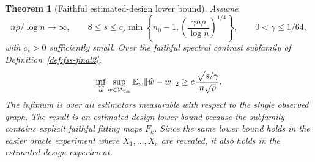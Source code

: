 \documentclass[12pt]{article}
\newtheorem{theorem}{Theorem}
\newcommand{\1}{\mathbf{1}}
\providecommand{\Eb}{\mathbb E}
\providecommand{\calW}{\mathcal W}
\begin{document}
\begin{theorem}[Faithful estimated-design lower bound]\label{thm:fss-lb-final2}
Assume
\[
  n\rho/\log n\to\infty,\qquad
  8\le s\le
  c_s\min\left\{n_0-1,\left(\frac{\gamma n\rho}{\log n}\right)^{1/4}\right\},
  \qquad
  0<\gamma\le 1/64,
\]
with \(c_s>0\) sufficiently small.  Over the faithful spectral contrast
subfamily of Definition~\ref{def:fss-final2},
\[
  \inf_{\widehat w}
  \sup_{w\in\calW_{\rm fss}}
  \Eb_w\|\widehat w-w\|_2
  \ge
  c\,\frac{\sqrt{s/\gamma}}{n\sqrt\rho}.
\]
The infimum is over all estimators measurable with respect to the single
observed graph.  The result is an estimated-design lower bound because
the subfamily contains explicit faithful fitting maps \(F_k\).  Since the
same lower bound holds in the easier oracle experiment where
\(X_1,\ldots,X_s\) are revealed, it also holds in the estimated-design
experiment.
\end{theorem}
\end{document}
